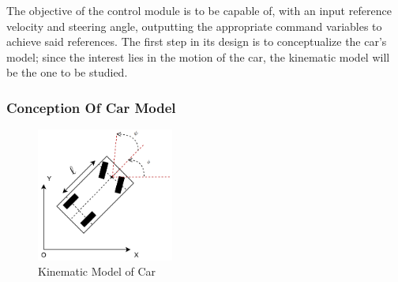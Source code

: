 The objective of the control module is to be capable of, with an input reference velocity and steering angle, outputting the appropriate command variables to achieve said references. The first step in its design is to conceptualize the car's model; since the interest lies in the motion of the car, the kinematic model will be the one to be studied.
\subsubsection{Conception Of Car Model}
\label{sec:concep}

\begin{figure}[!htbp]
\centering
       \includegraphics[page=1,width=0.4\textwidth]{img/kinematicModel.png} 
\caption{Kinematic Model of Car}%
\label{fig:kinModel}
\end{figure}

